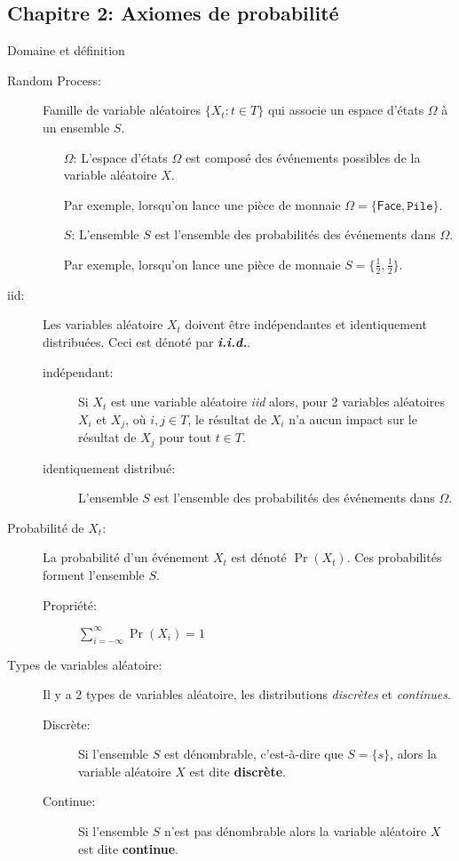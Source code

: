 \documentclass[10pt, french]{article}
\begin{document}
\begin{multicols*}{3}
\pagebreak
\section{Chapitre 2: Axiomes de probabilité}

\begin{rappel}{Domaine et définition}
\begin{description}
	\item[Random Process:]	Famille de variable aléatoires $\{X_{t}: t \in T\}$ qui associe un espace d'états $\Omega$ à un ensemble $S$.
	\begin{enumerate}
		\item[$\Omega$: ] L'espace d'états $\Omega$ est composé des événements possibles de la variable aléatoire $X$.
		\item[] Par exemple, lorsqu'on lance une pièce de monnaie $\Omega = \{\textsf{Face}, \texttt{Pile} \}$.
		\item[$S$: ] L'ensemble $S$ est l'ensemble des probabilités des événements dans $\Omega$.
		\item[] Par exemple, lorsqu'on lance une pièce de monnaie $S = \{\frac{1}{2}, \frac{1}{2} \}$.
	\end{enumerate}
\end{description}
\begin{description}
	\item[iid: ]	Les variables aléatoire $X_{t}$ doivent être indépendantes et identiquement distribuées. Ceci est dénoté par \textit{\textbf{i.i.d.}}.				
	\begin{description}
		\item[indépendant: ] Si $X_{t}$ est une variable aléatoire \textit{iid} alors, pour 2 variables aléatoires $X_{i}$ et $X_{j}$, où $i, j \in T$, le résultat de $X_{i}$ n'a aucun impact sur le résultat de $X_{j}$ pour tout $t \in T$.
		\item[identiquement distribué: ] L'ensemble $S$ est l'ensemble des probabilités des événements dans $\Omega$.
	\end{description}
	\item[Probabilité de $X_{t}$: ]	La probabilité d'un événement $X_{t}$ est dénoté $\Pr(X_{t})$. 
	Ces probabilités forment l'ensemble $S$.
	\begin{description}
		\item[Propriété: ] $\sum_{i = -\infty}^{\infty} \Pr(X_{i}) = 1$
	\end{description}
	\item[Types de variables aléatoire: ]	Il y a 2 types de variables aléatoire, les distributions \textit{discrètes} et \textit{continues}.
		\begin{description}
		\item[Discrète: ]	Si l'ensemble $S$ est dénombrable, c'est-à-dire que $S= \{s\}$, alors la variable aléatoire $X$ est dite \textbf{discrète}.
		\item[Continue: ]	Si l'ensemble $S$ n'est pas dénombrable alors la variable aléatoire $X$ est dite \textbf{continue}.
	\end{description}
\end{description}
\end{rappel}


\end{multicols*}
\end{document}
